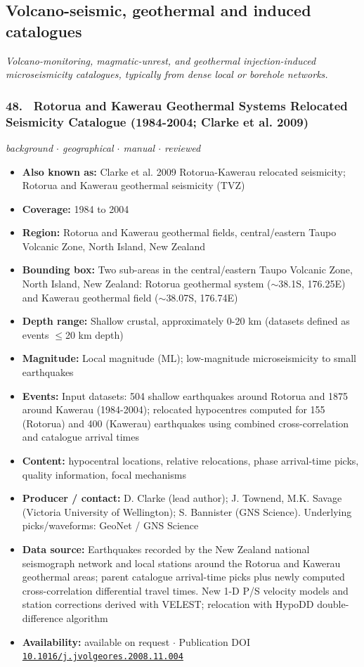 \documentclass[10pt,a4paper]{article}
\newcommand{\kv}[2]{\item \textbf{#1:} #2}
\begin{document}
\subsection{Volcano-seismic, geothermal and induced catalogues}
\textit{Volcano-monitoring, magmatic-unrest, and geothermal injection-induced microseismicity catalogues, typically from dense local or borehole networks.}\par\vspace{4pt}
\subsubsection*{\hypertarget{c:48}{48.}~ Rotorua and Kawerau Geothermal Systems Relocated Seismicity Catalogue (1984-2004; Clarke et al. 2009)}
{\small\itshape background $\cdot$ geographical $\cdot$ manual $\cdot$ reviewed}\par\vspace{2pt}
\begin{itemize}[leftmargin=1.3em,itemsep=0.6pt,topsep=1pt,parsep=0pt]
\kv{Also known as}{Clarke et al. 2009 Rotorua-Kawerau relocated seismicity; Rotorua and Kawerau geothermal seismicity (TVZ)}
\kv{Coverage}{1984 to 2004}
\kv{Region}{Rotorua and Kawerau geothermal fields, central/eastern Taupo Volcanic Zone, North Island, New Zealand}
\kv{Bounding box}{Two sub-areas in the central/eastern Taupo Volcanic Zone, North Island, New Zealand: Rotorua geothermal system ($\sim$38.1S, 176.25E) and Kawerau geothermal field ($\sim$38.07S, 176.74E)}
\kv{Depth range}{Shallow crustal, approximately 0-20 km (datasets defined as events $\leq$20 km depth)}
\kv{Magnitude}{Local magnitude (ML); low-magnitude microseismicity to small earthquakes}
\kv{Events}{Input datasets: 504 shallow earthquakes around Rotorua and 1875 around Kawerau (1984-2004); relocated hypocentres computed for 155 (Rotorua) and 400 (Kawerau) earthquakes using combined cross-correlation and catalogue arrival times}
\kv{Content}{hypocentral locations, relative relocations, phase arrival-time picks, quality information, focal mechanisms}
\kv{Producer / contact}{D. Clarke (lead author); J. Townend, M.K. Savage (Victoria University of Wellington); S. Bannister (GNS Science). Underlying picks/waveforms: GeoNet / GNS Science}
\kv{Data source}{Earthquakes recorded by the New Zealand national seismograph network and local stations around the Rotorua and Kawerau geothermal areas; parent catalogue arrival-time picks plus newly computed cross-correlation differential travel times. New 1-D P/S velocity models and station corrections derived with VELEST; relocation with HypoDD double-difference algorithm}
\kv{Availability}{available on request $\cdot$ Publication DOI \href{https://doi.org/10.1016/j.jvolgeores.2008.11.004}{\nolinkurl{10.1016/j.jvolgeores.2008.11.004}}}
\end{itemize}
\end{document}
